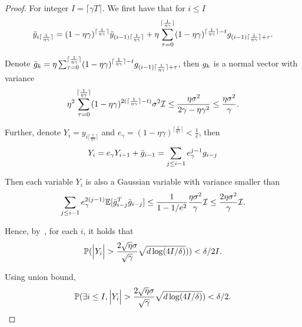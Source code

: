 \begin{proof}

For integer $I = \lceil \gamma T \rceil$. We first have that for $i \le I$
\begin{align*}
    \tilde y_{i \lceil\frac{1}{\eta \gamma} \rceil} = (1 - \eta \gamma)^{\lceil\frac{1}{\eta \gamma} \rceil} \tilde y_{(i-1)\lceil\frac{1}{\eta \gamma} \rceil }  + \eta \sum_{\tau = 0}^{\lceil\frac{1}{\eta \gamma} \rceil}  (1 - \eta \gamma)^{\lceil\frac{1}{\eta \gamma} \rceil - t}  {g}_{(i-1)\lceil\frac{1}{\eta \gamma} \rceil + \tau}.
\end{align*}

Denote $\bar {{g}}_{k} = \eta \sum_{\tau = 0}^{\lceil\frac{1}{\eta \gamma} \rceil}  (1 - \eta \gamma)^{\lceil\frac{1}{\eta \gamma} \rceil - t}  {g}_{(i-1)\lceil\frac{1}{\eta \gamma} \rceil + \tau}$, then ${g}_k$ is a normal vector with variance
\begin{align*}
     \eta^2 \sum_{\tau = 0}^{\lceil\frac{1}{\eta \gamma} \rceil} (1 - \eta \gamma)^{2(\lceil\frac{1}{\eta \gamma} \rceil - t)} \sigma^2 \mathcal{I} \le \frac{\eta \sigma^2}{2\gamma - \eta \gamma^2} \le  \frac{\eta \sigma^2}{\gamma}.
\end{align*}

Further, denote $Y_i = y_{i \lceil\frac{1}{\eta \gamma} \rceil}$ and $e_{\gamma} = (1 - \eta \gamma)^{\lceil\frac{1}{\eta \gamma} \rceil} < \frac{1}{e}$, then
\begin{align*}
    Y_i = e_{\gamma} Y_{i - 1} + \bar {{g}}_{i - 1} = \sum_{j \le i - 1} e_{\gamma}^{j - 1} {g}_{i - j}
\end{align*}


Then each variable $Y_i$ is also a Gaussian variable with variance smaller than 
\begin{align*}
     \sum_{j \le i - 1} e_{\gamma}^{2(j - 1)} \mathbb{E}[  \bar {{g}}_{i - j}^T \bar {{g}}_{i - j}] \le \frac{1}{1-1/e^2}\frac{\eta \sigma^2} {\gamma} \mathcal{I} \le \frac{2\eta \sigma^2}{\gamma} \mathcal{I} .
\end{align*}

Hence, by~, for each $i$, it holds that
\begin{align*}
    \mathbb{P}(\Big | Y_i \Big| > \frac{2 \sqrt{\eta} \sigma}{\sqrt{\gamma}} \sqrt{d \log(4I/\delta)})) < \delta/2I.
\end{align*}

Using union bound,
\begin{align*}
    \mathbb{P}(\exists i \le I, \Big | Y_i \Big| > \frac{2 \sqrt{\eta} \sigma}{\sqrt{\gamma}} \sqrt{d \log(4I/\delta)}) < \delta/2.
\end{align*}


\end{proof}
